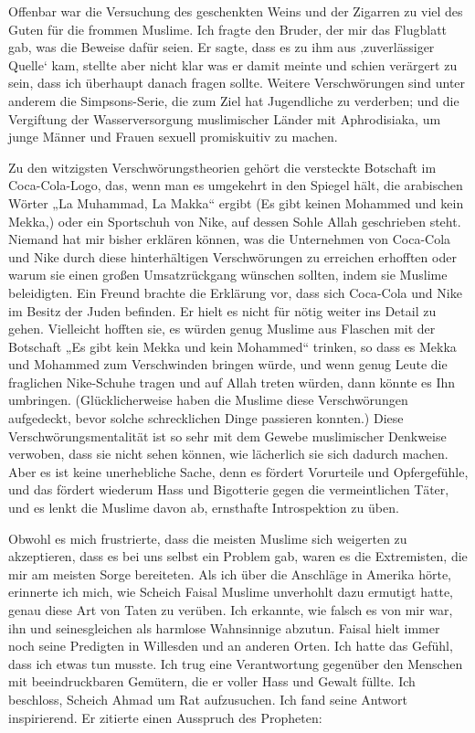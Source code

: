 \documentclass[12pt]{memoir}
\def\–{\hskip0pt-\hskip0pt}
\begin{document}
Offenbar war die Versuchung des geschenkten Weins und der Zigarren
zu viel des Guten für die frommen Muslime.
Ich fragte den Bruder, der mir das Flugblatt gab, was die Beweise dafür seien.
Er sagte, dass es zu ihm aus ‚zuverlässiger Quelle‘ kam,
stellte aber nicht klar was er damit meinte
und schien verärgert zu sein, dass ich überhaupt danach fragen sollte.
Weitere Verschwörungen sind unter anderem die Simpsons\–Serie,
die zum Ziel hat Jugendliche zu verderben;
und die Vergiftung der Wasserversorgung
muslimischer Länder mit Aphrodisiaka,
um junge Männer und Frauen sexuell promiskuitiv zu machen.

Zu den witzigsten Verschwörungstheorien
gehört die versteckte Botschaft im Coca\–Cola\–Logo,
das, wenn man es umgekehrt in den Spiegel hält,
die arabischen Wörter „La Muhammad, La Makka“ ergibt
(Es gibt keinen Mohammed und kein Mekka,)
oder ein Sportschuh von Nike, auf dessen Sohle Allah geschrieben steht.
Niemand hat mir bisher erklären können,
was die Unternehmen von Coca\–Cola und Nike
durch diese hinterhältigen Verschwörungen zu erreichen erhofften
oder warum sie einen großen Umsatzrückgang wünschen sollten,
indem sie Muslime beleidigten.
Ein Freund brachte die Erklärung vor, dass sich Coca\–Cola und Nike
im Besitz der Juden befinden.
Er hielt es nicht für nötig weiter ins Detail zu gehen.
Vielleicht hofften sie,
es würden genug Muslime aus Flaschen mit der Botschaft
„Es gibt kein Mekka und kein Mohammed“ trinken,
so dass es Mekka und Mohammed zum Verschwinden bringen würde,
und wenn genug Leute die fraglichen Nike\–Schuhe tragen
und auf Allah treten würden, dann könnte es Ihn umbringen.
(Glücklicherweise haben die Muslime diese Verschwörungen aufgedeckt,
bevor solche schrecklichen Dinge passieren konnten.)
Diese Verschwörungsmentalität ist so sehr
mit dem Gewebe muslimischer Denkweise verwoben,
dass sie nicht sehen können, wie lächerlich sie sich dadurch machen.
Aber es ist keine unerhebliche Sache,
denn es fördert Vorurteile und Opfergefühle,
und das fördert wiederum Hass und Bigotterie
gegen die vermeintlichen Täter,
und es lenkt die Muslime davon ab,
ernsthafte Introspektion zu üben.

Obwohl es mich frustrierte,
dass die meisten Muslime sich weigerten zu akzeptieren,
dass es bei uns selbst ein Problem gab,
waren es die Extremisten, die mir am meisten Sorge bereiteten.
Als ich über die Anschläge in Amerika hörte, erinnerte ich mich,
wie Scheich Faisal Muslime unverhohlt dazu ermutigt hatte,
genau diese Art von Taten zu verüben.
Ich erkannte, wie falsch es von mir war,
ihn und seinesgleichen als harmlose Wahnsinnige abzutun.
Faisal hielt immer noch seine Predigten in Willesden und an anderen Orten.
Ich hatte das Gefühl, dass ich etwas tun musste.
Ich trug eine Verantwortung gegenüber den Menschen
mit beeindruckbaren Gemütern, die er voller Hass und Gewalt füllte.
Ich beschloss, Scheich Ahmad um Rat aufzusuchen.
Ich fand seine Antwort inspirierend.
Er zitierte einen Ausspruch des Propheten:
\end{document}

